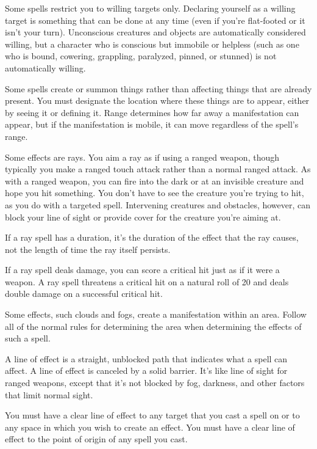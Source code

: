  Some spells restrict you to willing targets only. Declaring yourself as a willing target is something that can be done at any time (even if you're flat-footed or it isn't your turn). Unconscious creatures and objects are automatically considered willing, but a character who is conscious but immobile or helpless (such as one who is bound, cowering, grappling, paralyzed, pinned, or stunned) is not automatically willing.

 Some spells create or summon things rather than affecting things that are already present. You must designate the location where these things are to appear, either by seeing it or defining it. Range determines how far away a manifestation can appear, but if the manifestation is mobile, it can move regardless of the spell's range.

 Some effects are rays. You aim a ray as if using a ranged weapon, though typically you make a ranged touch attack rather than a normal ranged attack. As with a ranged weapon, you can fire into the dark or at an invisible creature and hope you hit something. You don't have to see the creature you're trying to hit, as you do with a targeted spell. Intervening creatures and obstacles, however, can block your line of sight or provide cover for the creature you're aiming at.

If a ray spell has a duration, it's the duration of the effect that the ray causes, not the length of time the ray itself persists.

If a ray spell deals damage, you can score a critical hit just as if it were a weapon. A ray spell threatens a critical hit on a natural roll of 20 and deals double damage on a successful critical hit.

 Some effects, such clouds and fogs, create a manifestation within an area. Follow all of the normal rules for determining the area when determining the effects of such a spell.

 A line of effect is a straight, unblocked path that indicates what a spell can affect. A line of effect is canceled by a solid barrier. It's like line of sight for ranged weapons, except that it's not blocked by fog, darkness, and other factors that limit normal sight.

You must have a clear line of effect to any target that you cast a spell on or to any space in which you wish to create an effect. You must have a clear line of effect to the point of origin of any spell you cast.

